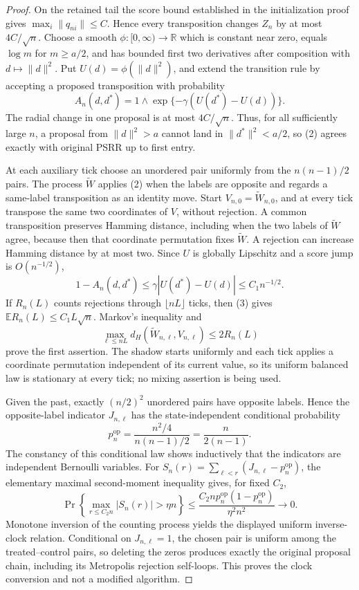 \documentclass{article}
\begin{document}
\begin{proof}
On the retained tail the score bound established in the initialization proof gives \(\max_i\|q_{ni}\|\le C\).  Hence every transposition changes \(Z_n\) by at most \(4C/\sqrt n\).  Choose a smooth \(\phi:[0,\infty)\to\mathbb R\) which is constant near zero, equals \(\log m\) for \(m\ge a/2\), and has bounded first two derivatives after composition with \(d\mapsto\|d\|^2\).  Put \(U(d)=\phi(\|d\|^2)\), and extend the transition rule by accepting a proposed transposition with probability
\[
 A_n(d,d^*)=1\wedge\exp\{-\gamma(U(d^*)-U(d))\}. \tag{2}
\]
The radial change in one proposal is at most \(4C/\sqrt n\).  Thus, for all sufficiently large \(n\), a proposal from \(\|d\|^2>a\) cannot land in \(\|d^*\|^2<a/2\), so (2) agrees exactly with original PSRR up to first entry.

At each auxiliary tick choose an unordered pair uniformly from the \(n(n-1)/2\) pairs.  The process \(\widetilde W\) applies (2) when the labels are opposite and regards a same-label transposition as an identity move.  Start \(V_{n,0}=\widetilde W_{n,0}\), and at every tick transpose the same two coordinates of \(V\), without rejection.  A common transposition preserves Hamming distance, including when the two labels of \(\widetilde W\) agree, because then that coordinate permutation fixes \(\widetilde W\).  A rejection can increase Hamming distance by at most two.  Since \(U\) is globally Lipschitz and a score jump is \(O(n^{-1/2})\),
\[
 1-A_n(d,d^*)\le\gamma|U(d^*)-U(d)|\le C_1n^{-1/2}. \tag{3}
\]
If \(R_n(L)\) counts rejections through \(\lfloor nL\rfloor\) ticks, then (3) gives \(\mathbb E R_n(L)\le C_1L\sqrt n\).  Markov's inequality and
\[
 \max_{\ell\le nL}d_H(\widetilde W_{n,\ell},V_{n,\ell})\le2R_n(L)
\]
prove the first assertion.  The shadow starts uniformly and each tick applies a coordinate permutation independent of its current value, so its uniform balanced law is stationary at every tick; no mixing assertion is being used.

Given the past, exactly \((n/2)^2\) unordered pairs have opposite labels.  Hence the opposite-label indicator \(J_{n,\ell}\) has the state-independent conditional probability
\[
 p_n^{\mathrm{op}}=\frac{n^2/4}{n(n-1)/2}=\frac{n}{2(n-1)}.
\]
The constancy of this conditional law shows inductively that the indicators are independent Bernoulli variables.  For \(S_n(r)=\sum_{\ell<r}(J_{n,\ell}-p_n^{\mathrm{op}})\), the elementary maximal second-moment inequality gives, for fixed \(C_2\),
\[
 \Pr\left\{\max_{r\le C_2n}|S_n(r)|>\eta n\right\}
 \le \frac{C_2n p_n^{\mathrm{op}}(1-p_n^{\mathrm{op}})}{\eta^2n^2}\longrightarrow0.
\]
Monotone inversion of the counting process yields the displayed uniform inverse-clock relation.  Conditional on \(J_{n,\ell}=1\), the chosen pair is uniform among the treated--control pairs, so deleting the zeros produces exactly the original proposal chain, including its Metropolis rejection self-loops.  This proves the clock conversion and not a modified algorithm.
\end{proof}
\end{document}

